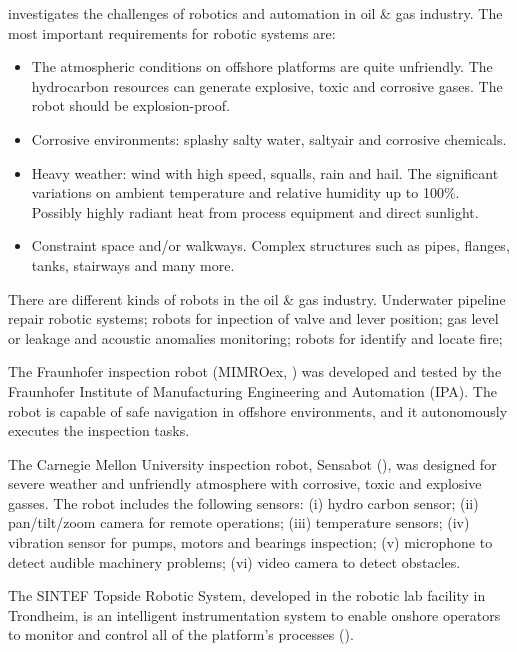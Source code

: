 \documentclass{ifacconf}
\begin{document}
\cite{chen} investigates the challenges of robotics and automation in oil
\& gas industry. The most important requirements for robotic systems are:
\begin{itemize}
\item The atmospheric conditions on offshore platforms are quite unfriendly. The
hydrocarbon resources can generate explosive, toxic and corrosive gases. The
robot should be explosion-proof.
\item Corrosive environments: splashy salty water, saltyair and corrosive
chemicals.
\item Heavy weather: wind with high speed, squalls, rain and hail. The
significant variations on ambient temperature and relative humidity up to
100\%. Possibly highly radiant heat from process equipment and direct sunlight. 
\item Constraint space and/or walkways. Complex structures such as pipes,
flanges, tanks, stairways and many more.
\end{itemize}

There are different kinds of robots in the oil \& gas industry. Underwater
pipeline repair robotic systems; robots for inpection of valve and lever
position; gas level or leakage and acoustic anomalies monitoring; robots for
identify and locate fire; 

The Fraunhofer inspection robot (MIMROex, \cite{mimroex}) was developed and
tested by the Fraunhofer Institute of Manufacturing Engineering and Automation (IPA). The
robot is capable of safe navigation in offshore environments, and it
autonomously executes the inspection tasks.

The Carnegie Mellon University inspection robot, Sensabot (\cite{sensabot}), was
designed for severe weather and unfriendly atmosphere with corrosive, toxic and explosive
gasses. The robot includes the following sensors: (i) hydro carbon sensor; (ii)
pan/tilt/zoom camera for remote operations; (iii) temperature sensors; (iv)
vibration sensor for pumps, motors and bearings inspection; (v) microphone to
detect audible machinery problems; (vi) video camera to detect obstacles.

The SINTEF Topside Robotic System, developed in the robotic lab facility in
Trondheim, is an intelligent instrumentation system to enable onshore operators
to monitor and control all of the platform's processes
(\cite{kyrkjebo2009robotic}).
\end{document}
